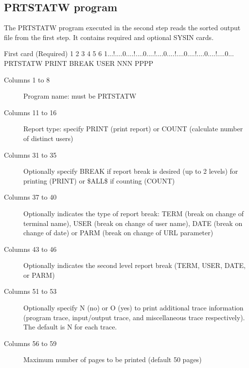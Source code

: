 \documentclass[letterpaper,10pt,english]{sphinxmanual}
\begin{document}
\ignorespaces 

\subsection{PRTSTATW program}
\label{\detokenize{audit_operations_ and_performance:prtstatw-program}}\label{\detokenize{audit_operations_ and_performance:index-89}}
The PRTSTATW program executed in the second step reads the sorted output file from the first step. It contains required and optional SYSIN cards.

\begin{sphinxVerbatim}[commandchars=\\\{\}]
First card (Required)
         1         2         3         4         5         6
1...!....0....!....0....!....0....!....0....!....0....!....0...
PRTSTATW PRINT                BREAK USER          NNN  PPPP
\end{sphinxVerbatim}

\begin{description}
\item[{Columns 1 to 8}] \leavevmode
Program name: must be PRTSTATW

\item[{Columns 11 to 16}] \leavevmode
Report type: specify PRINT (print report) or COUNT (calculate number of distinct users)

\item[{Columns 31 to 35}] \leavevmode
Optionally specify BREAK if report break is desired (up to 2 levels) for printing (PRINT) or \$ALL\$ if counting (COUNT)

\item[{Columns 37 to 40}] \leavevmode
Optionally indicates the type of report break: TERM (break on change of terminal name), USER (break on change of user name), DATE (break on change of date) or PARM (break on change of URL parameter)

\item[{Columns 43 to 46}] \leavevmode
Optionally indicates the second level report break (TERM, USER, DATE, or PARM)

\item[{Columns 51 to 53}] \leavevmode
Optionally specify N (no) or O (yes) to print additional trace information (program trace, input/output trace, and miscellaneous trace respectively). The default is N for each trace.

\item[{Columns 56 to 59}] \leavevmode
Maximum number of pages to be printed (default 50 pages)

\end{description}
\end{document}

